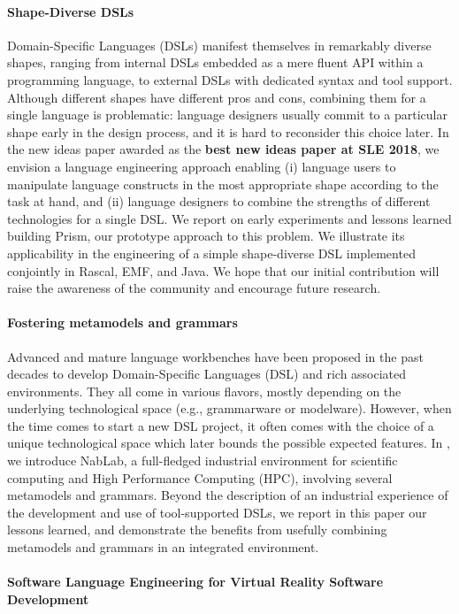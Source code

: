 \paragraph{Shape-Diverse DSLs}
Domain-Specific Languages (DSLs) manifest themselves in remarkably diverse shapes, ranging from internal DSLs embedded as a mere fluent API within a programming language, to external DSLs with dedicated syntax and tool support. Although different shapes have different pros and cons, combining them for a single language is problematic: language designers usually commit to a particular shape early in the design process, and it is hard to reconsider this choice later. In the new ideas paper \cite{coulon:hal-01889155} awarded as the \textbf{best new ideas paper at SLE 2018}, we envision a language engineering approach enabling (i) language users to manipulate language constructs in the most appropriate shape according to the task at hand, and (ii) language designers to combine the strengths of different technologies for a single DSL. We report on early experiments and lessons learned building Prism, our prototype approach to this problem. We illustrate its applicability in the engineering of a simple shape-diverse DSL implemented conjointly in Rascal, EMF, and Java. We hope that our initial contribution will raise the awareness of the community and encourage future research.

\paragraph{Fostering metamodels and grammars}
Advanced and mature language workbenches have been proposed in the past decades to develop Domain-Specific Languages (DSL) and rich associated environments. They all come in various flavors, mostly depending on the underlying technological space (e.g., grammarware or modelware). However, when the time comes to start a new DSL project, it often comes with the choice of a unique technological space which later bounds the possible expected features. In \cite{lelandais:hal-01910139}, we introduce NabLab, a full-fledged industrial environment for scientific computing and High Performance Computing (HPC), involving several metamodels and grammars. Beyond the description of an industrial experience of the development and use of tool-supported DSLs, we report in this paper our lessons learned, and demonstrate the benefits from usefully combining metamodels and grammars in an integrated environment.

\paragraph{Software Language Engineering for Virtual Reality Software Development}

